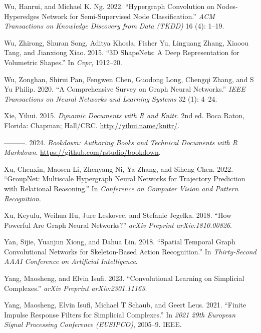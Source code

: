 \documentclass[
  12pt,
]{krantz}
\newlength{\cslhangindent}
\newenvironment{CSLReferences}[2] %
 {\begin{list}{}{%
  \setlength{\itemindent}{0pt}
  \setlength{\leftmargin}{0pt}
  \setlength{\parsep}{0pt}
  \ifodd #1
   \setlength{\leftmargin}{\cslhangindent}
   \setlength{\itemindent}{-1\cslhangindent}
  \fi
  \setlength{\itemsep}{#2\baselineskip}}}
 {\end{list}}
\begin{document}
\begin{CSLReferences}{1}{0}
Wu, Hanrui, and Michael K. Ng. 2022. {``Hypergraph Convolution on
Nodes-Hyperedges Network for Semi-Supervised Node Classification.''}
\emph{ACM Transactions on Knowledge Discovery from Data (TKDD)} 16 (4):
1--19.

Wu, Zhirong, Shuran Song, Aditya Khosla, Fisher Yu, Linguang Zhang,
Xiaoou Tang, and Jianxiong Xiao. 2015. {``3{D} {S}hape{N}ets: A Deep
Representation for Volumetric Shapes.''} In \emph{Cvpr}, 1912--20.

Wu, Zonghan, Shirui Pan, Fengwen Chen, Guodong Long, Chengqi Zhang, and
S Yu Philip. 2020. {``A Comprehensive Survey on Graph Neural
Networks.''} \emph{IEEE Transactions on Neural Networks and Learning
Systems} 32 (1): 4--24.

Xie, Yihui. 2015. \emph{Dynamic Documents with {R} and Knitr}. 2nd ed.
Boca Raton, Florida: Chapman; Hall/CRC. \url{http://yihui.name/knitr/}.

---------. 2024. \emph{Bookdown: Authoring Books and Technical Documents
with {R} {M}arkdown}. \url{https://github.com/rstudio/bookdown}.

Xu, Chenxin, Maosen Li, Zhenyang Ni, Ya Zhang, and Siheng Chen. 2022.
{``Group{N}et: Multiscale Hypergraph Neural Networks for Trajectory
Prediction with Relational Reasoning.''} In \emph{Conference on Computer
Vision and Pattern Recognition}.

Xu, Keyulu, Weihua Hu, Jure Leskovec, and Stefanie Jegelka. 2018. {``How
Powerful Are Graph Neural Networks?''} \emph{arXiv Preprint
arXiv:1810.00826}.

Yan, Sijie, Yuanjun Xiong, and Dahua Lin. 2018. {``Spatial Temporal
Graph Convolutional Networks for Skeleton-Based Action Recognition.''}
In \emph{Thirty-Second AAAI Conference on Artificial Intelligence}.

Yang, Maosheng, and Elvin Isufi. 2023. {``Convolutional Learning on
Simplicial Complexes.''} \emph{arXiv Preprint arXiv:2301.11163}.

Yang, Maosheng, Elvin Isufi, Michael T Schaub, and Geert Leus. 2021.
{``Finite Impulse Response Filters for Simplicial Complexes.''} In
\emph{2021 29th European Signal Processing Conference (EUSIPCO)},
2005--9. IEEE.


\end{CSLReferences}
\end{document}
